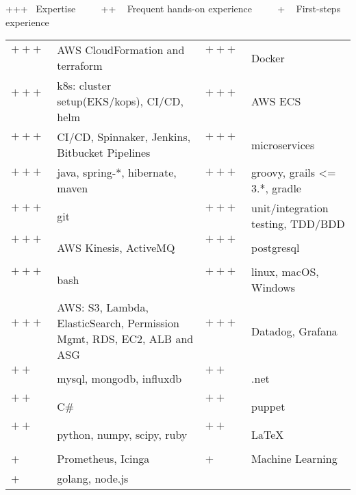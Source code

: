 
\newcommand{\plus}{$+~$~~~~}
\newcommand{\pplus}{$++~$~~~~}
\newcommand{\ppplus}{$+++$~~~~~}
\begin{cventries}
\cventry
{+++ ~Expertise   ~~~~ ++ ~ Frequent hands-on experience ~~~~ + ~ First-steps experience \vspace{0.1em}} %
{} %
{} %
{} %
{ %
\hspace{1em}
\setlength{\tabcolsep}{3pt}
\begin{tabular}{  l l @{\hskip 3mm} l l }
		   \ppplus & AWS CloudFormation and terraform &  \ppplus & Docker\\
		   \ppplus & k8s: cluster setup(EKS/kops), CI/CD, helm & \ppplus & AWS ECS\\
		   \ppplus & CI/CD, Spinnaker, Jenkins, Bitbucket Pipelines & \ppplus & microservices \\
           \ppplus & java, spring-*, hibernate, maven  & \ppplus & groovy, grails <= 3.*, gradle \\ 
           \ppplus & git & \ppplus & unit/integration testing, TDD/BDD   \\
		   \ppplus & AWS Kinesis, ActiveMQ & \ppplus & postgresql\\
           \ppplus & bash & \ppplus & linux, macOS, Windows\\ 
           \ppplus & AWS: S3, Lambda, ElasticSearch, Permission Mgmt, RDS, EC2, ALB and ASG & \ppplus & Datadog, Grafana \vspace{0.7em} \\ 
           \pplus & mysql, mongodb, influxdb  & \pplus & .net  \\
           \pplus & C\# & \pplus & puppet \\
           \pplus &python, numpy, scipy, ruby & \pplus & \LaTeX\\
           \plus & Prometheus, Icinga & \plus & Machine Learning  \\
           \plus & golang, node.js
\end{tabular}
}
\end{cventries}
